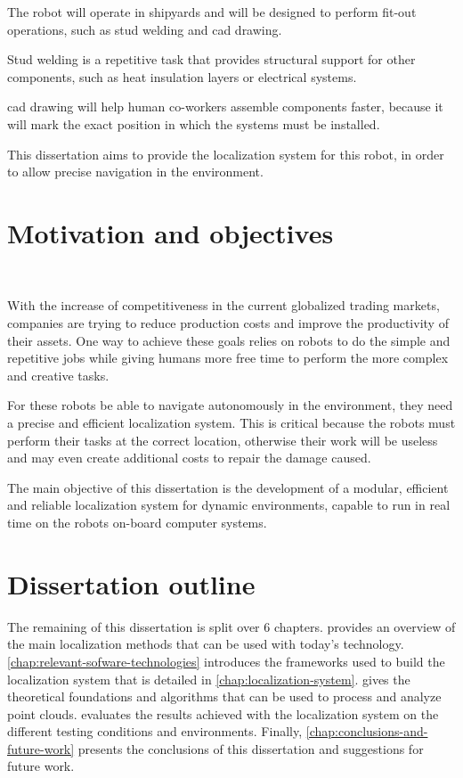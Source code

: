 The robot will operate in shipyards and will be designed to perform fit-out operations, such as stud welding and \gls{cad} drawing.

Stud welding is a repetitive task that provides structural support for other components, such as heat insulation layers or electrical systems.

\gls{cad} drawing will help human co-workers assemble components faster, because it will mark the exact position in which the systems must be installed.

This dissertation aims to provide the localization system for this robot, in order to allow precise navigation in the environment.



\section{Motivation and objectives} \label{sec:introduction_goals}\

With the increase of competitiveness in the current globalized trading markets, companies are trying to reduce production costs and improve the productivity of their assets. One way to achieve these goals relies on robots to do the simple and repetitive jobs while giving humans more free time to perform the more complex and creative tasks.

For these robots be able to navigate autonomously in the environment, they need a precise and efficient localization system. This is critical because the robots must perform their tasks at the correct location, otherwise their work will be useless and may even create additional costs to repair the damage caused.

The main objective of this dissertation is the development of a modular, efficient and reliable localization system for dynamic environments, capable to run in real time on the robots on-board computer systems.



\section{Dissertation outline} \label{sec:introduction_structure}

The remaining of this dissertation is split over 6 chapters.  provides an overview of the main localization methods that can be used with today's technology. \cref{chap:relevant-sofware-technologies} introduces the frameworks used to build the localization system that is detailed in \cref{chap:localization-system}.  gives the theoretical foundations and algorithms that can be used to process and analyze point clouds.  evaluates the results achieved with the localization system on the different testing conditions and environments. Finally, \cref{chap:conclusions-and-future-work} presents the conclusions of this dissertation and suggestions for future work.
